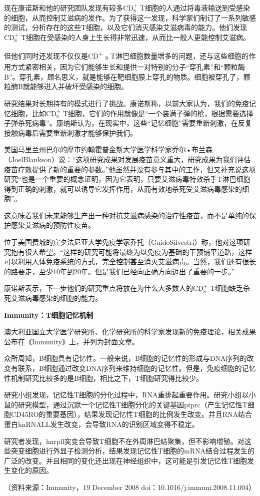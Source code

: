 现在康诺斯和他的研究团队发现有较多CD$_8^+$
T细胞的人通过将毒液输送到受感染的细胞，从而控制艾滋病的发作。为了获得这一发现，科学家们制订了一系列敏感的测试，分析存在的这些T细胞，以及它们消灭感染艾滋病毒的能力。他们发现CD$_8^+$
T细胞在受感染的人身上生长得非常迅速，从而比一般人更能控制艾滋病。

但他们同时还发现不仅仅是CD\textsuperscript{+} \textsubscript{8}
T淋巴细胞数量增多的问题，还与这些细胞的作用方式紧密相关，因为它们能够生长和提供一对特别的分子“穿孔素”和“颗粒酶B”。穿孔素，顾名思义，就是能够在靶细胞膜上穿孔的物质。细胞被穿孔了，颗粒酶B就能够进入并破坏受感染的细胞。

研究结果对长期持有的模式进行了挑战。康诺斯称，以前大家认为，我们的免疫记忆细胞，比如CD$_8^+$
T细胞，它们的作用就像是“一个装满子弹的枪，根据需要选择子弹杀死病毒”。康纳斯认为，在现实中，这些“记忆细胞”需要重新刺激，在反复接触病毒后需要重新刺激才能够保护我们。

美国马里兰州巴尔的摩市约翰霍普金斯大学医学科学家乔尔•布兰森（JoelBlankson）说：“这项研究成果对发展疫苗意义重大，研究成果为我们评估疫苗疗效提供了新的重要的参数。”他虽然并没有参与其中的工作，但又补充说这项研究“也是一个重要的概念证明，因为它表明，只要艾滋病毒特效杀手T淋巴细胞得到正确的刺激，就可以诱导它发挥作用，从而有效地杀死受艾滋病毒感染的细胞”。

这意味着我们未来能够生产出一种对抗艾滋病感染的治疗性疫苗，而不是单纯的保护感染艾滋病的预防性疫苗。

位于美国费城的宾夕法尼亚大学免疫学家乔托（GuidoSilvestri）称，他对这项研究抱有很大希望。“这样的研究可能将最终为以免疫为基础的干预铺平道路，这样可以利用人体免疫系统的方式，完全控制甚至消灭艾滋病毒。当然，我们还有很长的路要走，至少10年到20年。但是我们已经向正确方向迈出了重要的一步。”

康诺斯表示，下一步他们的研究重点将放在为什么大多数人的CD$_8^+$ T细胞缺乏杀死艾滋病毒感染的细胞的能力。

\begin{center}
 \textbf{\Large Immunity：T细胞记忆机制}
 \end{center}

澳大利亚国立大学医学研究所、化学研究所的科学家发现新的免疫理论，相关成果公布在《Immunity》上，并列为封面文章。

众所周知，B细胞具有记忆性。一般来说，B细胞的记忆性的形成与DNA序列的改变有联系，B细胞通过改变DNA序列来维持细胞的记忆性。但是，免疫细胞的记忆性机制研究比较多的是B细胞，相比之下，T细胞研究得比较少。

研究小组发现，记忆性T细胞的分化过程中，RNA重排起重要作用。研究小组以小鼠的研究模型，通过沉默一个记忆性T细胞分化的关键基因ptprc（产生记忆性T细胞CD45RO的重要基因），结果发现记忆性T细胞的比例发生改变。并且RNA结合蛋白hnRNALL发生改变，会导致RNA的识别区域变得不稳定。

研究者发现，hnrpll突变会导致T细胞不在外周淋巴结聚集，但不影响增殖。对这些突变细胞进行外显子检测分析，结果发现记忆性T细胞的mRNA结合过程发生的广泛的改变。并且相同的变化还出现在神经组织中，这可能是引发记忆性T细胞发生变化的原因。

（资料来源：Immunity，19 December 2008
doi：10.1016/j.immuni.2008.11.004）

